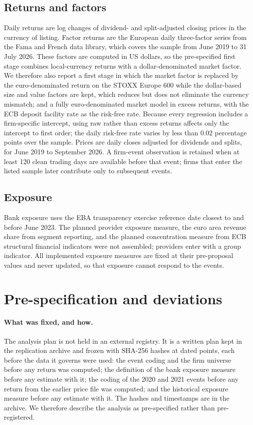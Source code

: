 \documentclass[11pt]{article}
\theoremstyle{plain}\newtheorem{proposition}{Proposition}
\begin{document}
\subsection{Returns and factors}
Daily returns are log changes of dividend- and split-adjusted closing prices in the currency of listing. Factor returns are the European daily three-factor series from the Fama and French data library, which covers the sample from June 2019 to 31 July 2026. These factors are computed in US dollars, so the pre-specified first stage combines local-currency returns with a dollar-denominated market factor. We therefore also report a first stage in which the market factor is replaced by the euro-denominated return on the STOXX Europe 600 while the dollar-based size and value factors are kept, which reduces but does not eliminate the currency mismatch; and a fully euro-denominated market model in excess returns, with the ECB deposit facility rate as the risk-free rate. Because every regression includes a firm-specific intercept, using raw rather than excess returns affects only the intercept to first order; the daily risk-free rate varies by less than 0.02 percentage points over the sample. Prices are daily closes adjusted for dividends and splits, for June 2019 to September 2026. A firm-event observation is retained when at least 120 clean trading days are available before that event; firms that enter the listed sample later contribute only to subsequent events. 

\subsection{Exposure}
Bank exposure uses the EBA transparency exercise reference date closest to and before June 2023. The planned provider exposure measure, the euro area revenue share from segment reporting, and the planned concentration measure from ECB structural financial indicators were not assembled; providers enter with a group indicator. All implemented exposure measures are fixed at their pre-proposal values and never updated, so that exposure cannot respond to the events.

\clearpage
\section{Pre-specification and deviations}\label{app:prereg}

\paragraph{What was fixed, and how.} The analysis plan is not held in an external registry. It is a written plan kept in the replication archive and frozen with SHA-256 hashes at dated points, each before the data it governs were used: the event coding and the firm universe before any return was computed; the definition of the bank exposure measure before any estimate with it; the coding of the 2020 and 2021 events before any return from the earlier price file was computed; and the historical exposure measure before any estimate with it. The hashes and timestamps are in the archive. We therefore describe the analysis as pre-specified rather than pre-registered.
\end{document}
